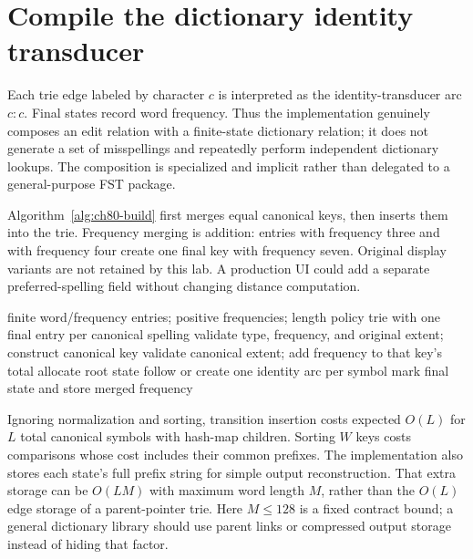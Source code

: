 \section{Compile the dictionary identity transducer}
\label{sec:ch80-build}
Each trie edge labeled by character $c$ is interpreted as the identity-transducer arc $c:c$.
Final states record word frequency.
Thus the implementation genuinely composes an edit relation with a finite-state dictionary relation; it does not generate a set of misspellings and repeatedly perform independent dictionary lookups.
The composition is specialized and implicit rather than delegated to a general-purpose FST package.

Algorithm~\ref{alg:ch80-build} first merges equal canonical keys, then inserts them into the trie.
Frequency merging is addition: entries  with frequency three and  with frequency four create one final key  with frequency seven.
Original display variants are not retained by this lab.
A production UI could add a separate preferred-spelling field without changing distance computation.

\begin{algorithm}[htbp]
\caption{Compile bounded normalized dictionary entries into an identity transducer.}
\label{alg:ch80-build}
\begin{pseudocode}
\Require finite word/frequency entries; positive frequencies; length policy
\Ensure trie with one final entry per canonical spelling
\State validate type, frequency, and original extent; construct canonical key
\State validate canonical extent; add frequency to that key's total
\EndFor
\State allocate root state
\State follow or create one identity arc per symbol
\State mark final state and store merged frequency
\EndFor
\end{pseudocode}
\end{algorithm}

Ignoring normalization and sorting, transition insertion costs expected $O(L)$ for $L$ total canonical symbols with hash-map children.
Sorting $W$ keys costs comparisons whose cost includes their common prefixes.
The implementation also stores each state's full prefix string for simple output reconstruction.
That extra storage can be $O(LM)$ with maximum word length $M$, rather than the $O(L)$ edge storage of a parent-pointer trie.
Here $M\le128$ is a fixed contract bound; a general dictionary library should use parent links or compressed output storage instead of hiding that factor.

